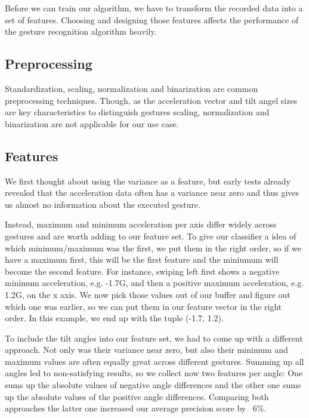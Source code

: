 Before we can train our algorithm, we  have to transform the recorded data into a set  of  features.
Choosing  and  designing  those  features  affects  the  performance  of  the gesture recognition algorithm heavily.

\subsection{Preprocessing}
\label{ch:DataCollection:sec:FeatureDesign:sub:Preprocessing}

Standardization,     scaling,     normalization     and     binarization     are     common preprocessing techniques.
Though, as the acceleration vector and tilt angel sizes are key characteristics  to  distinguish  gestures  scaling,  normalization  and  binarization  are  not applicable for our use case. 

\subsection{Features}
\label{ch:DataCollection:sec:FeatureDesign:sub:Features}

We  first  thought  about  using  the  variance  as  a  feature,  but  early  tests  already revealed  that  the  acceleration  data  often  has  a  variance  near  zero  and  thus  gives  us almost no information about the executed gesture.

Instead,  maximum  and  minimum  acceleration  per  axis  differ  widely  across gestures  and  are  worth  adding  to  our  feature  set.
To give our classifier a idea of which minimum/maximum was the first, we put them in the right order, so if we have a maximum first, this will be the first feature and the miniumum will become the second feature.
For  instance,  swiping  left  first  shows  a negative  minimum  acceleration, e.g. -1.7G, and then a positive  maximum acceleration, e.g. 1.2G, on the x axis.
We now pick those values out of our buffer and figure out which one was earlier, so we can put them in our feature vector in the right order.
In  this example, we end up with the tuple (-1.7, 1.2).

To include the tilt angles into our feature set, we had to come up with a different approach.
Not only was their variance near zero, but also their minimum and maximum values  are  often  equally  great  across  different  gestures. 
Summing  up  all  angles  led  to non-satisfying  results,  so  we  collect  now  two  features  per  angle:
One  sums  up  the absolute  values  of  negative  angle  differences  and  the  other  one  sums  up  the  absolute values  of  the  positive  angle  differences.
Comparing  both  approaches  the  latter  one increased our average precision  score by ~6\%.

